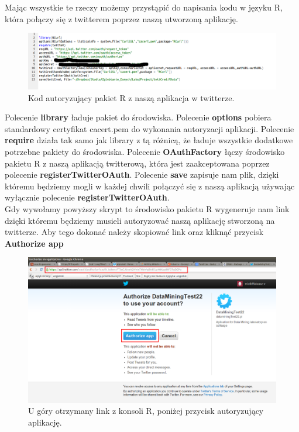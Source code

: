 \documentclass[12pt,a4paper]{article}
\begin{document}
Mając wszystkie te rzeczy możemy przystąpić do napisania kodu w języku R, która połączy się z twitterem poprzez naszą utworzoną aplikację.

\begin{figure}[H]
\includegraphics[scale=0.45]{pictures/Code1.png}
\caption{Kod autoryzujący pakiet R z naszą aplikacja w twitterze.}
\end{figure}

Polecenie \textbf{library} ładuje pakiet do środowiska. Polecenie \textbf{options} pobiera standardowy certyfikat cacert.pem do wykonania autoryzacji aplikacji. Polecenie \textbf{require} działa tak samo jak library z tą różnicą, że ładuje wszystkie dodatkowe potrzebne pakiety do środowiska. Polecenie \textbf{OAuthFactory} łączy środowisko pakietu R z naszą aplikacją twitterową, która jest zaakceptowana poprzez polecenie \textbf{registerTwitterOAuth}. Polecenie \textbf{save} zapisuje nam plik, dzięki któremu będziemy mogli w każdej chwili połączyć się z naszą aplikacją używając wyłącznie polecenie \textbf{registerTwitterOAuth}. \\
Gdy wywołamy powyższy skrypt to środowisko pakietu R wygeneruje nam link dzięki któremu będziemy musieli autoryzować naszą aplikację stworzoną na twitterze. Aby tego dokonać należy skopiować link oraz kliknąć przycisk \textbf{Authorize app}
\begin{figure}[H]
\begin{center}
\includegraphics[scale=0.25]{pictures/Twitter5.png}
\caption{U góry otrzymany link z konsoli R, poniżej przycisk autoryzujący aplikację.}
\end{center}
\end{figure}
\end{document}

